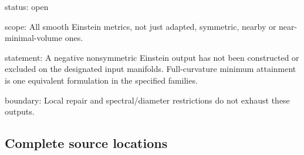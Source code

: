 \documentclass[
  10pt,
]{article}
\begin{document}
status: open

scope: All smooth Einstein metrics, not just adapted, symmetric, nearby
or near-minimal-volume ones.

statement: A negative nonsymmetric Einstein output has not been
constructed or excluded on the designated input manifolds.
Full-curvature minimum attainment is one equivalent formulation in the
specified families.

boundary: Local repair and spectral/diameter restrictions do not exhaust
these outputs.

\hypertarget{complete-source-locations}{%
\subsection{Complete source locations}\label{complete-source-locations}}
\end{document}
